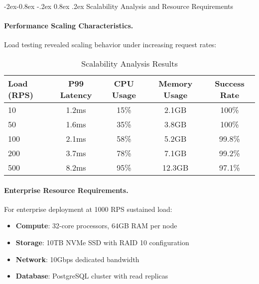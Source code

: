 \documentclass[manuscript,screen,9pt]{acmart}
\makeatletter
\renewcommand\subsubsection{\@startsection{subsubsection}{3}{\z@}%
  {-2ex\@plus -0.8ex \@minus -.2ex}%
  {0.8ex \@plus .2ex}%
  {\normalfont\normalsize\bfseries}}
\newcommand{\tablesize}{\footnotesize}
\newcommand{\tableheader}[1]{\textbf{#1}}
\makeatother
\begin{document}
\subsubsection{Scalability Analysis and Resource Requirements}
\label{subsubsec:scalability_analysis}

\paragraph{Performance Scaling Characteristics.}
Load testing revealed scaling behavior under increasing request rates:

\begin{table}[!htb]
\centering
\caption{Scalability Analysis Results}
\label{tab:scalability_analysis}
\tablesize
\begin{tabular}{@{}lcccc@{}}
\toprule
\tableheader{Load (RPS)} & \tableheader{P99 Latency} & \tableheader{CPU Usage} & \tableheader{Memory Usage} & \tableheader{Success Rate} \\
\midrule
10 & 1.2ms & 15\% & 2.1GB & 100\% \\
50 & 1.6ms & 35\% & 3.8GB & 100\% \\
100 & 2.1ms & 58\% & 5.2GB & 99.8\% \\
200 & 3.7ms & 78\% & 7.1GB & 99.2\% \\
500 & 8.2ms & 95\% & 12.3GB & 97.1\% \\
\bottomrule
\end{tabular}
\end{table}

\paragraph{Enterprise Resource Requirements.}
For enterprise deployment at 1000 RPS sustained load:
\begin{itemize}[leftmargin=*,itemsep=1pt,parsep=1pt]
    \item \textbf{Compute}: 32-core processors, 64GB RAM per node
    \item \textbf{Storage}: 10TB NVMe SSD with RAID 10 configuration
    \item \textbf{Network}: 10Gbps dedicated bandwidth
    \item \textbf{Database}: PostgreSQL cluster with read replicas
\end{itemize}
\end{document}
